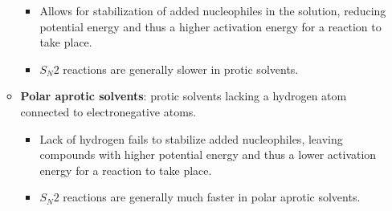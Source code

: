 \documentclass[12pt,a4paper]{article}
\begin{document}
\begin{itemize}
\begin{itemize}
\begin{itemize}
                \item Allows for {\color{o-Sun}stabilization of added nucleophiles} in the solution, reducing potential energy and thus a {\color{o-Sun}higher activation energy} for a reaction to take place. 
                \item \(S_N2\) reactions are generally {\color{o-Sun}slower in protic solvents}.
            \end{itemize}
        \item \textbf{Polar aprotic solvents}: protic solvents lacking a hydrogen atom connected to electronegative atoms.
            \begin{itemize}
                \item Lack of hydrogen {\color{o-Sun}fails to stabilize added nucleophiles}, leaving compounds with higher potential energy and thus a {\color{o-Sun}lower activation energy} for a reaction to take place.
                \item \(S_N2\) reactions are generally much {\color{o-Sun}faster in polar aprotic solvents}.
            \end{itemize}
    \end{itemize}
\end{itemize}
\end{document}
